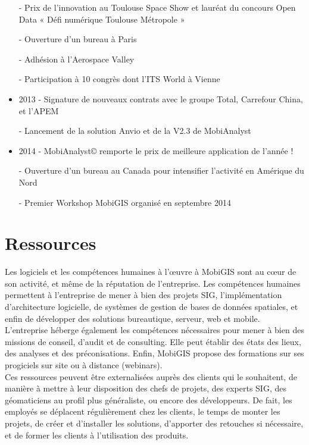 \begin{itemize}
		- Prix de l’innovation au Toulouse Space Show et lauréat du concours Open Data « Défi numérique Toulouse Métropole » 
    
		- Ouverture d’un bureau à Paris 
    
		- Adhésion à l’Aerospace Valley 
    
		- Participation à 10 congrès dont l’ITS World à Vienne 
\\
\item 2013 
    - Signature de nouveaux contrats avec le groupe Total, Carrefour China, et l’APEM 
    
		- Lancement de la solution Anvio et de la V2.3 de MobiAnalyst 
\\
\item 2014
    - MobiAnalyst© remporte le prix de meilleure application de l'année !
    
		- Ouverture d'un bureau au Canada pour intensifier l'activité en Amérique du Nord
    
		- Premier Workshop MobiGIS organisé en septembre 2014 

\end{itemize}



\section{Ressources}

Les logiciels et les compétences humaines à l’\oe uvre à MobiGIS sont au c\oe ur de son activité, et même de la réputation de l’entreprise. Les compétences humaines permettent à l’entreprise de mener à bien des projets SIG, l'implémentation d’architecture logicielle, de systèmes de gestion de bases de données spatiales, et enfin de développer des solutions bureautique, serveur, web et mobile. \\

L’entreprise héberge également les compétences nécessaires pour mener à bien des missions de conseil, d’audit et de consulting. Elle peut établir des états des lieux, des analyses et des préconisations. Enfin, MobiGIS propose des formations sur ses progiciels sur site ou à distance (webinars). \\

Ces ressources peuvent être externalisées auprès des clients qui le souhaitent, de manière à mettre à leur disposition des chefs de projets, des experts SIG, des géomaticiens au profil plus généraliste, ou encore des développeurs. De fait, les employés se déplacent régulièrement chez les clients, le temps de monter les projets, de créer et d’installer les solutions, d’apporter des retouches si nécessaire, et de former les clients à l’utilisation des produits. \\

